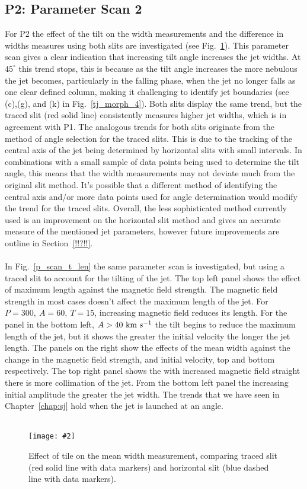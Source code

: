 \documentclass[12pt]{ociamthesis}
\newcommand{\mfig}[4]{
  \begin{figure}
  \begin{center}
  \texttt{[image: \#2]}
  \caption{#3}
  \label{#4}
  \end{center}
  \end{figure}}
\newcommand{\kms}{~\rm{km ~s^{-1}}}
\newcommand{\np}{\\ \\}
\begin{document}
\subsection{P2: Parameter Scan 2}
\label{subsec:pscansII_I}
For P2 the effect of the tilt on the width measurements and the difference in widths measures using both slits are investigated (see Fig.~\ref{width_measure}). This parameter scan gives a clear indication that increasing tilt angle increases the jet widths. At $45^{\circ}$ this trend stops, this is because as the tilt angle increases the more nebulous the jet becomes, particularly in the falling phase, when the jet no longer falls as one clear defined column, making it challenging to identify jet boundaries (see (c),(g), and (k) in Fig.~\ref{tj_morph_4}). Both slits display the same trend, but the traced slit (red solid line) consistently measures higher jet widths, which is in agreement with P1. The analogous trends for both slits originate from the method of angle selection for the traced slits. This is due to the tracking of the central axis of the jet being determined by horizontal slits with small intervals. In combinations with a small sample of data points being used to determine the tilt angle, this means that the width measurements may not deviate much from the original slit method. It's possible that a different method of identifying the central axis and/or more data points used for angle determination would modify the trend for the traced slits. Overall, the less sophisticated method currently used is an improvement on the horizontal slit method and gives an accurate measure of the mentioned jet parameters, however future improvements are outline in Section~\ref{!!?!!}. \np
%
In Fig.~\ref{p_scan_t_len} the same parameter scan is investigated, but using a traced slit to account for the tilting of the jet. The top left panel shows the effect of maximum length against the magnetic field strength. The magnetic field strength in most cases doesn’t affect the maximum length of the jet. For $P=300,~A=60,~T=15$, increasing magnetic field reduces its length. For the panel in the bottom left, $A>40 \kms$ the tilt begins to reduce the maximum length of the jet, but it shows the greater the initial velocity the longer the jet length. The panels on the right show the effects of the mean width against the change in the magnetic field strength, and initial velocity, top and bottom respectively. The top right panel shows the with increased magnetic field straight there is more collimation of the jet. From the bottom left panel the increasing initial amplitude the greater the jet width. The trends that we have seen in Chapter~\ref{chap:sj} hold when the jet is launched at an angle.  \np
\mfig{1}{figures/mean_w_vs_tilt.png}{Effect of tile on the mean width measurement, comparing traced slit (red solid line with data markers) and horizontal slit (blue dashed line with data markers).}{width_measure}
\end{document}
